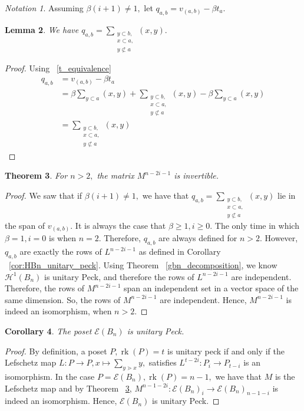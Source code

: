 \documentclass[10 pt]{amsart}
\theoremstyle{plain}
\newtheorem{thm}{Theorem}[section]
\newtheorem{lem}[thm]{Lemma}
\newtheorem{cor}[thm]{Corollary}
\theoremstyle{definition}
\theoremstyle{remark}
\newtheorem{note}[thm]{Notation}
\numberwithin{equation}{section}
\newcommand\rk{\operatorname{rk}}
\newcommand\fbn{\mathcal H}
\begin{document}
\begin{note}
Assuming $\beta(i+1) \neq 1,$ let $q_{a,b} = v_{(a, b)} - \beta t_a.$
\end{note}

\begin{lem}
We have $q_{a,b} = \sum_{\substack{{y\subset b,}\\{x \subset a,}\\{y\not\subset a}}}^{}(x, y).$
\end{lem}
\begin{proof}
Using ~\ref{t_equivalence}
\begin{align*}
	q_{a,b} &= v_{(a, b)} - \beta t_a \\
	&= \beta \sum_{y \subset a}^{}(x, y) + \sum_{\substack{{y\subset b,}\\{x \subset a,}\\{y\not\subset a}}}^{}(x, y) - \beta\sum_{y\subset a}^{}(x, y)\\
	&= \sum_{\substack{{y\subset b,}\\{x \subset a,}\\{y\not\subset a}}}^{}(x, y)
\end{align*}
\end{proof}

\begin{thm}
\label{thm:invertibility_lefschetz}
For $n >2,$ the matrix $M^{n-2i-1}$ is invertible.
\end{thm}
\begin{proof}
We saw that if $\beta(i+1) \neq 1,$ we have that $q_{a,b} = \sum_{\substack{{y\subset b,}\\{x \subset a,}\\{y\not\subset a}}}^{}(x, y)$ lie in the span of $v_{(a, b)}.$ It is always the case that $\beta \geq 1,i \geq 0.$ The only time in which $\beta = 1,i=0$ is when $n = 2.$ Therefore, $q_{a,b}$ are always defined for $n > 2.$ However, $q_{a,b}$ are exactly the rows of $L^{n-2i-1}$ as defined in Corollary ~\ref{cor:HBn_unitary_peck}. Using Theorem ~\ref{gbn_decomposition}, we know $\fbn^1(B_n)$ is unitary Peck, and therefore the rows of $L^{n-2i-1}$ are independent. Therefore, the rows of $M^{n-2i-1}$ span an independent set in a vector space of the same dimension. So, the rows of $M^{n-2i-1}$ are independent. Hence, $M^{n-2i-1}$ is indeed an isomorphism, when $n > 2.$
\end{proof}

\begin{cor}
\label{cor:unitary_peck_edge_bn}
The poset $\mathcal E(B_n)$ is unitary Peck.
\end{cor}
\begin{proof}
By definition, a poset $P,\rk(P) = t$  is unitary peck if and only if the Lefschetz map $L:P \rightarrow P,x \mapsto \sum_{y \gtrdot x} y,$ satisfies $L^{t-2i}:P_i \rightarrow P_{t-i}$ is an isomorphism. In the case $P = \mathcal E(B_n),\rk(P) = n-1,$ we have that $M$ is the Lefschetz map and by Theorem ~\ref{thm:invertibility_lefschetz}, $M^{n-1-2i}:\mathcal E(B_n)_i \rightarrow \mathcal E(B_n)_{n-1-i}$ is indeed an isomorphism. Hence, $\mathcal E(B_n)$ is unitary Peck.
\end{proof}
\end{document}
